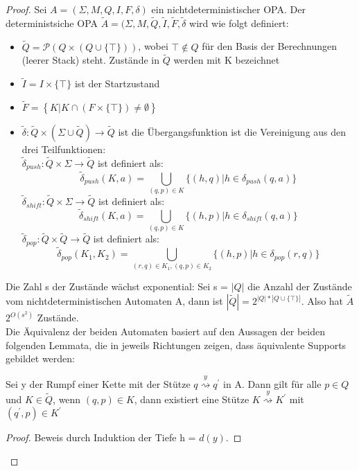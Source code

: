 \begin{proof}
Sei $A=(\Sigma, M, Q, I, F, \delta)$ ein nichtdeterministischer OPA. Der deterministsiche OPA $\tilde{A}=(\Sigma, M, \tilde{Q}, \tilde{I}, \tilde{F}, \tilde{\delta}$ wird wie folgt definiert:
\begin{itemize}
\item
$\tilde{Q} = \mathcal{P}(Q \times (Q \cup \{\top\}))$, wobei $\top \notin Q$ für den Basis der Berechnungen (leerer Stack) steht. Zustände in $\tilde{Q}$ werden mit K bezeichnet
\item
$\tilde{I}=I\times \{\top \}$ ist der Startzustand
\item
$\tilde{F}=\left\{K|K \cap (F \times \{\top\}) \neq \emptyset\right\}$
\item
$\tilde{\delta}: \tilde{Q} \times (\Sigma \cup \tilde{Q})\rightarrow \tilde{Q}$ ist die Übergangsfunktion ist die Vereinigung aus den drei Teilfunktionen:\\[2ex]
$\tilde{\delta}_{push}: \tilde{Q} \times \Sigma \rightarrow \tilde{Q}$ ist definiert als: 
\begin{equation*}
\tilde{\delta}_{push}(K, a) = \bigcup\limits_{(q,p) \in K} \{(h,q)|h \in \delta_{push}(q,a)\}
\end{equation*}
$\tilde{\delta}_{shift}: \tilde{Q} \times \Sigma \rightarrow \tilde{Q}$ ist definiert als: 
\begin{equation*}
\tilde{\delta}_{shift}(K, a) = \bigcup\limits_{(q,p) \in K} \{(h,p)|h \in \delta_{shift}(q,a)\}
\end{equation*}
$\tilde{\delta}_{pop}: \tilde{Q} \times \tilde{Q}\rightarrow \tilde{Q}$ ist definiert als: 
\begin{equation*}
\tilde{\delta}_{pop}(K_1, K_2) = \bigcup\limits_{(r,q) \in K_1, (q,p)\in K_2} \{(h,p)|h \in \delta_{pop}(r,q)\}
\end{equation*}
\end{itemize}
Die Zahl s der Zustände wächst exponential: Sei s = $|Q|$ die Anzahl der Zustände vom nichtdeterministischen Automaten A, dann ist $|\tilde{Q}| = 2^{|Q| * |Q \cup \{\top\}|}$. Also hat $\tilde{A}$  $2^{O(s^2)}$ Zustände.\\
Die Äquivalenz der beiden Automaten basiert auf den Aussagen der beiden folgenden Lemmata, die in jeweils Richtungen zeigen, dass äquivalente Supports gebildet werden:
\begin{lemma}
Sei y der Rumpf einer Kette mit der Stütze $q\stackrel{y}{\rightsquigarrow} q^\prime$ in A. Dann gilt für alle $p \in Q$ und $K \in \tilde{Q}$, wenn $(q,p) \in K$, dann existiert eine Stütze $K\stackrel{y}{\rightsquigarrow} K^\prime$ mit $(q^\prime, p) \in K^\prime $
\end{lemma}
\begin{proof}
\label{lemma_deter1}
Beweis durch Induktion der Tiefe h = $d(y)$. 

\end{proof}
\end{proof}
